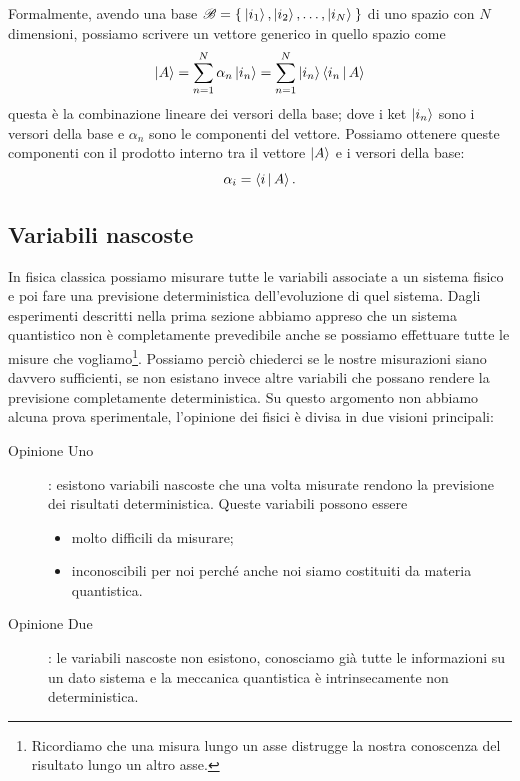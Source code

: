 Formalmente, avendo una base $\mathscr{B} = \Set{\Ket{i_1}, \Ket{i_2}, \dots, \Ket{i_N}}$ di uno spazio con $N$ dimensioni, possiamo scrivere un vettore generico in quello spazio come
\begin{equation}
	\Ket{A}=\sum_{n=1}^{N} \alpha_n \Ket{i_n} = \sum_{n=1}^{N} \Ket{i_n} \Braket{i_n|A}
\end{equation}
questa è la combinazione lineare dei versori della base; dove i ket $\Ket{i_n}$ sono i versori della base e $\alpha_n$ sono le componenti del vettore. Possiamo ottenere queste componenti con il prodotto interno tra il vettore $\Ket{A}$ e i versori della base:
\begin{equation}
	\label{eqn:decomp}
	\alpha_i = \Braket{i|A}.
\end{equation}

\subsection{Variabili nascoste}
In fisica classica possiamo misurare tutte le variabili associate a un sistema fisico e poi fare una previsione deterministica dell'evoluzione di quel sistema. Dagli esperimenti descritti nella prima sezione abbiamo appreso che un sistema quantistico non è completamente prevedibile anche se possiamo effettuare tutte le misure che vogliamo\footnote{Ricordiamo che una misura lungo un asse distrugge la nostra conoscenza del risultato lungo un altro asse.}. Possiamo perciò chiederci se le nostre misurazioni siano davvero sufficienti, se non esistano invece altre variabili che possano rendere la previsione completamente deterministica. Su questo argomento non abbiamo alcuna prova sperimentale, l'opinione dei fisici è divisa in due visioni principali:
\begin{description}
	\item[Opinione Uno]: esistono variabili nascoste che una volta misurate rendono la previsione dei risultati deterministica. Queste variabili possono essere
	\begin{itemize}
		\item molto difficili da misurare;
		\item inconoscibili per noi perché anche noi siamo costituiti da materia quantistica.
	\end{itemize}
	\item[Opinione Due]: le variabili nascoste non esistono, conosciamo già tutte le informazioni su un dato sistema e la meccanica quantistica è intrinsecamente non deterministica.
\end{description}

